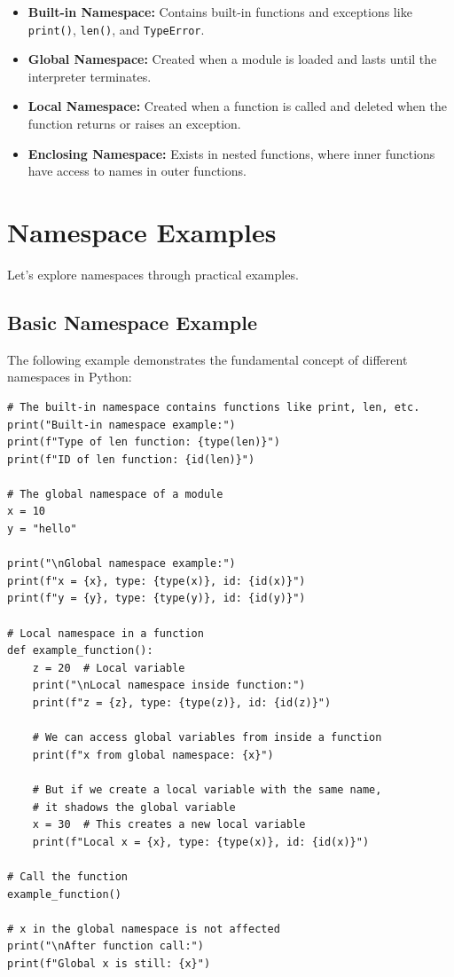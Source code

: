 \documentclass[12pt,letterpaper]{article}
\newenvironment{macterminal}{%
    \begin{mdframed}[
        linecolor=terminalFrame,
        backgroundcolor=terminalBg,
        roundcorner=5pt,
        skipabove=10pt,
        skipbelow=10pt,
        linewidth=1pt,
        innertopmargin=10pt, %
        frametitle={%
            \tikz[baseline=(current bounding box.east), outer sep=0pt]{
                \fill[red!80!black] (0,0) circle (5pt);
                \fill[yellow!80!black] (0.7,0) circle (5pt);
                \fill[green!70!black] (1.4,0) circle (5pt);
            }
        },
        frametitlealignment=\raggedright, %
        frametitleaboveskip=8pt, %
        frametitlebelowskip=0pt, %
    ]
}{%
    \end{mdframed}%
}
\begin{document}
\begin{itemize}
    \item \textbf{\textcolor{pythonBlue}{Built-in Namespace:}} Contains built-in functions and exceptions like \texttt{print()}, \texttt{len()}, and \texttt{TypeError}.
    \item \textbf{\textcolor{pythonBlue}{Global Namespace:}} Created when a module is loaded and lasts until the interpreter terminates.
    \item \textbf{\textcolor{pythonBlue}{Local Namespace:}} Created when a function is called and deleted when the function returns or raises an exception.
    \item \textbf{\textcolor{pythonBlue}{Enclosing Namespace:}} Exists in nested functions, where inner functions have access to names in outer functions.
\end{itemize}

\section{Namespace Examples}

Let's explore namespaces through practical examples.

\subsection{Basic Namespace Example}

The following example demonstrates the fundamental concept of different namespaces in Python:

\begin{macterminal}
\begin{lstlisting}
# The built-in namespace contains functions like print, len, etc.
print("Built-in namespace example:")
print(f"Type of len function: {type(len)}")
print(f"ID of len function: {id(len)}")

# The global namespace of a module
x = 10
y = "hello"

print("\nGlobal namespace example:")
print(f"x = {x}, type: {type(x)}, id: {id(x)}")
print(f"y = {y}, type: {type(y)}, id: {id(y)}")

# Local namespace in a function
def example_function():
    z = 20  # Local variable
    print("\nLocal namespace inside function:")
    print(f"z = {z}, type: {type(z)}, id: {id(z)}")
    
    # We can access global variables from inside a function
    print(f"x from global namespace: {x}")
    
    # But if we create a local variable with the same name,
    # it shadows the global variable
    x = 30  # This creates a new local variable
    print(f"Local x = {x}, type: {type(x)}, id: {id(x)}")

# Call the function
example_function()

# x in the global namespace is not affected
print("\nAfter function call:")
print(f"Global x is still: {x}")
\end{lstlisting}
\end{macterminal}
\end{document}
